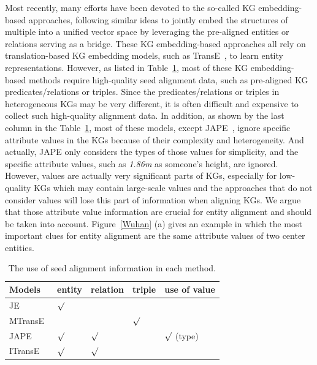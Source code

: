 	Most recently, many efforts have been devoted to the so-called KG embedding-based approaches, following similar ideas to jointly embed
the structures of multiple \KGs into a unified vector space by leveraging the pre-aligned entities or relations serving as a bridge. These
KG embedding-based approaches all rely on translation-based KG embedding models, such as TransE~\cite{bordes2013translating}, to learn
entity representations. However, as listed in Table~\ref{seed}, most of these KG embedding-based methods require high-quality seed
alignment data, such as pre-aligned KG predicates/relations or triples. Since the predicates/relations or triples in heterogeneous KGs may
be very different, it is often difficult and expensive to collect such high-quality alignment data. In addition, as shown by the last
column in the Table~\ref{seed}, most of these models, except JAPE~\cite{sun2017cross}, ignore specific attribute values in the KGs because
of their complexity and heterogeneity. And actually, JAPE only considers the types of those values for simplicity, and the specific
attribute values, such as \textit{1.86m} as someone's height, are ignored. However, values are actually very significant parts of KGs, especially for low-quality KGs which may contain large-scale values and the approaches that do not consider values will lose this part of information when aligning KGs. We argue that those attribute value information are crucial for entity alignment and should be taken into account. Figure~\ref{Wuhan} (a) gives an example in which the most important clues for entity alignment are the same attribute values of two center entities.
	\begin{table}
		\centering
		\scriptsize
		\begin{tabular}{lllll}
			\toprule
			\bf Models & \bf entity & \bf relation & \bf triple & \bf use of value \\
			\midrule
			JE~\cite{hao2016joint} & ${\surd}$ & & & \\
			MTransE~\cite{chen2016multilingual} & $ $ & $ $ & ${\surd}$ & \\
			JAPE~\cite{sun2017cross} & ${\surd}$& ${\surd}$& & ${\surd}$ (type)\\
			ITransE~\cite{zhu2017iterative} & ${\surd}$ & ${\surd}$& & \\
			\bottomrule
		\end{tabular}
		\caption{The use of seed alignment information in each method.}
		\label{seed}
	\end{table}
	
